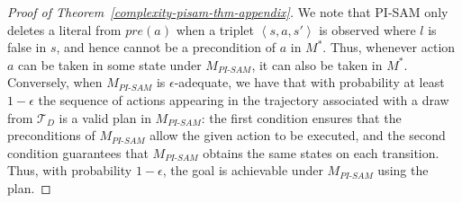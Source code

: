\documentclass{article}
\theoremstyle{plain}
\theoremstyle{definition}
\theoremstyle{remark}
\theoremstyle{observation}
\newcommand{\tuple}[1]{\ensuremath{\left \langle #1 \right \rangle }}
\newcommand{\pre}{\textit{pre}}
\newcommand{\eff}{\textit{eff}}
\newcommand{\pisam}{\textit{PI-SAM}\xspace}
\newcommand{\iseff}{\textit{IsEff}}
\begin{document}
\begin{proof}[Proof of Theorem~\ref{complexity-pisam-thm-appendix}]
We note that PI-SAM only deletes a literal from $\pre(a)$ when a triplet $\tuple{s,a,s'}$ is observed where $l$ is false in $s$, and hence cannot be a precondition of $a$ in $M^*$. Thus, whenever action $a$ can be taken in some state under $M_\pisam$, it can also be taken in $M^*$. Conversely, when $M_\pisam$ is $\epsilon$-adequate, we have that with probability at least $1-\epsilon$ the sequence of actions appearing in the trajectory associated with a draw from $\mathcal{T}_D$ is a valid plan in $M_\pisam$: the first condition ensures that the preconditions of $M_\pisam$ allow the given action to be executed, and the second condition guarantees that $M_\pisam$ obtains the same states on each transition. Thus, with probability $1-\epsilon$, the goal is achievable under $M_\pisam$ using the plan.
\end{proof}

        
\end{document}
